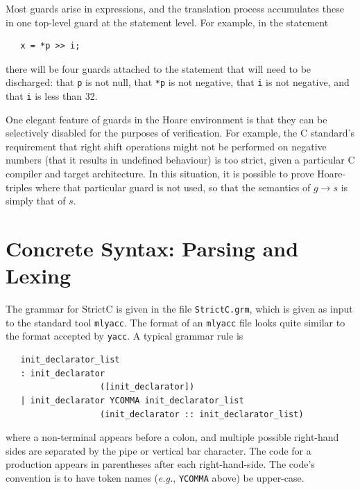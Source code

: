 \documentclass{article}
\newcommand{\strictc}{\textsf{StrictC}}
\newcommand{\srcfile}[1]{\texttt{#1}}
\newcommand{\eg}{\textit{e.g.}}
\begin{document}
Most guards arise in expressions, and the
translation process accumulates these in one top-level guard at the
statement level.  For example, in the statement
\begin{verbatim}
   x = *p >> i;
\end{verbatim}
there will be four guards attached to the statement that will need to
be discharged: that \texttt{p} is not null, that \texttt{*p} is not
negative, that \texttt{i} is not negative, and that \texttt{i} is less
than 32.

One elegant feature of guards in the Hoare environment is that they
can be selectively disabled for the purposes of verification.  For
example, the C standard's requirement that right shift operations might not
be performed on negative numbers (that it results in undefined
behaviour) is too strict, given a particular C compiler and target
architecture.  In this situation, it is possible to prove
Hoare-triples where that particular guard is not used, so that the
semantics of $g\to s$ is simply that of $s$.



\appendix
\section{Concrete Syntax: Parsing and Lexing}
\label{sec:grammar}

The grammar for \strictc{} is given in the file \srcfile{StrictC.grm}, which
is given as input to the standard tool \texttt{mlyacc}.  The format of
an \texttt{mlyacc} file looks quite similar to the format accepted by
\texttt{yacc}.  A typical grammar rule is
\begin{verbatim}
   init_declarator_list
   : init_declarator
                   ([init_declarator])
   | init_declarator YCOMMA init_declarator_list
                   (init_declarator :: init_declarator_list)
\end{verbatim}
where a non-terminal appears before a colon, and multiple possible
right-hand sides are separated by the pipe or vertical bar character.
The code for a production appears in parentheses after each
right-hand-side.  The code's convention is to have token names (\eg,
\texttt{YCOMMA} above) be upper-case.
\end{document}
